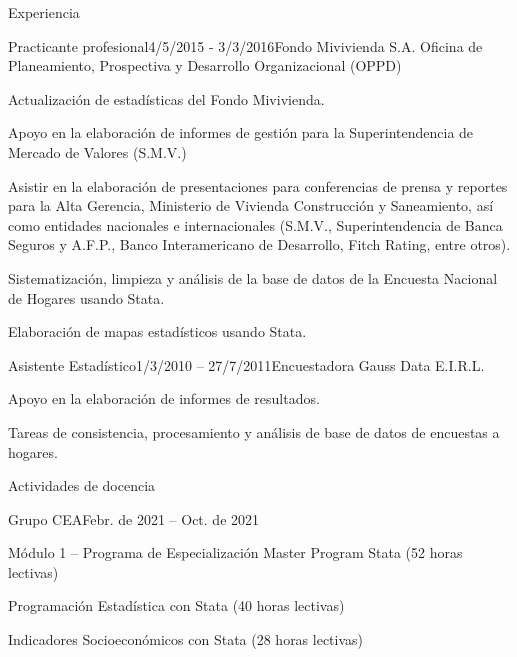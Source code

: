 \documentclass[
11pt, %
]{resume} %
\begin{document}
\begin{rSection}{Experiencia}
			
			\begin{rSubsection}{Practicante profesional}{4/5/2015 - 3/3/2016}{Fondo Mivivienda S.A. Oficina de Planeamiento, Prospectiva y Desarrollo Organizacional (OPPD)}{}
				\item	Actualización de estadísticas del Fondo Mivivienda.
				\item	Apoyo en la elaboración de informes de gestión para la Superintendencia de Mercado de Valores (S.M.V.)
				\item	Asistir en la elaboración de presentaciones para conferencias de prensa y reportes para la Alta Gerencia, Ministerio de Vivienda Construcción y Saneamiento, así como entidades nacionales e internacionales (S.M.V., Superintendencia de Banca Seguros y A.F.P., Banco Interamericano de Desarrollo, Fitch Rating, entre otros).
				\item	Sistematización, limpieza y análisis de la base de datos de la Encuesta Nacional de Hogares usando Stata. 
				\item	Elaboración de mapas estadísticos usando Stata.
			\end{rSubsection}
			
			
			\begin{rSubsection}{Asistente Estadístico}{1/3/2010 – 27/7/2011}{Encuestadora Gauss Data E.I.R.L.}{}
				\item	Apoyo en la elaboración de informes de resultados.
				\item	Tareas de consistencia, procesamiento y análisis de base de datos de encuestas a hogares.
			\end{rSubsection}
			
		\end{rSection}
		
		
		
		\begin{rSection}{Actividades de docencia}
			
			\begin{rSubsection}{Grupo CEA}{Febr. de 2021 – Oct. de 2021}{}{}
				\item	Módulo 1 – Programa de Especialización Master Program Stata (52 horas lectivas)
				\item	Programación Estadística con Stata (40 horas lectivas)
				\item	Indicadores Socioeconómicos con Stata (28 horas lectivas)
			\end{rSubsection}
			
		\end{rSection}
		
\end{document}

